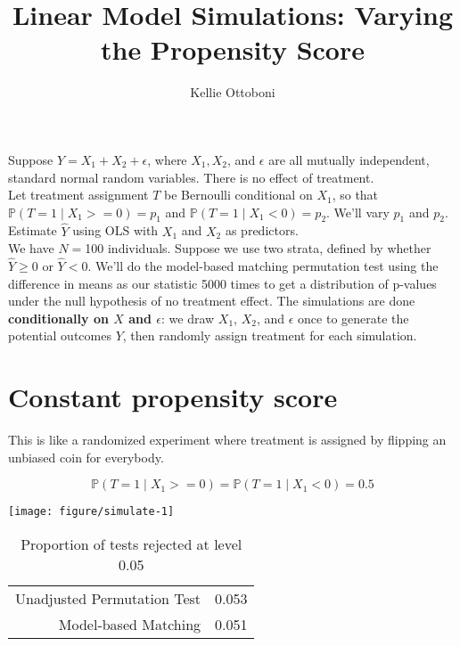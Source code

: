 \documentclass[11pt]{article}\usepackage[]{graphicx}\usepackage[]{color}
\title{Linear Model Simulations: Varying the Propensity Score}
\author{Kellie Ottoboni}
\makeatletter
\def\maxwidth{ %
  \ifdim\Gin@nat@width>\linewidth
    \linewidth
  \else
    \Gin@nat@width
  \fi
}
\newenvironment{knitrout}{}{} %
\makeatother
\begin{document}
\maketitle


Suppose $Y = X_1 + X_2 + \epsilon$, where $X_1, X_2$, and $\epsilon$ are all mutually independent, standard normal random variables. There is no effect of treatment. \\

Let treatment assignment $T$ be Bernoulli conditional on $X_1$, so that $\mathbb{P}(T = 1 \mid X_1 >= 0) = p_1$ and $\mathbb{P}(T = 1 \mid X_1 < 0) = p_2$. We'll vary $p_1$ and $p_2$. \\

Estimate $\hat{Y}$ using OLS with $X_1$ and $X_2$ as predictors. \\



We have $N=$100 individuals.  Suppose we use two strata, defined by whether $\hat{Y} \geq 0$ or $\hat{Y} < 0$.  We'll do the model-based matching permutation test using the difference in means as our statistic 5000 times to get a distribution of p-values under the null hypothesis of no treatment effect. The simulations are done \textbf{conditionally on $X$ and $\epsilon$}: we draw $X_1$, $X_2$, and $\epsilon$ once to generate the potential outcomes $Y$, then randomly assign treatment for each simulation.






\section{Constant propensity score}
This is like a randomized experiment where treatment is assigned by flipping an unbiased coin for everybody.

$$\mathbb{P}(T = 1 \mid X_1 >= 0) = \mathbb{P}(T = 1 \mid X_1 < 0) = 0.5$$


\begin{knitrout}
\color{fgcolor}

{\centering \texttt{[image: figure/simulate-1]} 

}



\end{knitrout}

\begin{table}[ht]
\centering
\begin{tabular}{rr}
  \hline
  \hline
Unadjusted Permutation Test & 0.053 \\ 
  Model-based Matching & 0.051 \\ 
   \hline
\end{tabular}
\caption{Proportion of tests rejected at level 0.05} 
\end{table}
\end{document}
